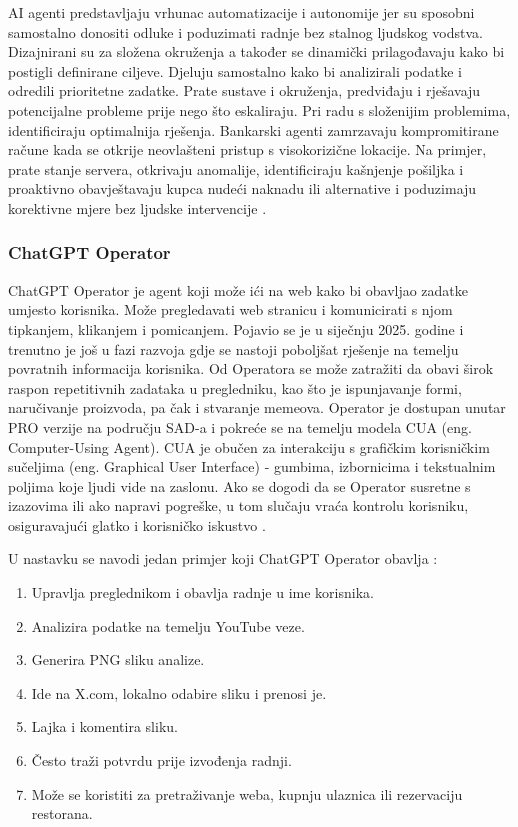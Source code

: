 \documentclass[]{foi}
\begin{document}
AI agenti predstavljaju vrhunac automatizacije i autonomije jer su sposobni samostalno donositi odluke i poduzimati radnje bez stalnog ljudskog vodstva. Dizajnirani su za složena okruženja a 
također se dinamički prilagođavaju kako bi postigli definirane ciljeve. Djeluju samostalno kako bi analizirali podatke i odredili prioritetne zadatke. Prate sustave i okruženja, predviđaju i rješavaju 
potencijalne probleme prije nego što eskaliraju. Pri radu s složenijim problemima, identificiraju optimalnija rješenja. Bankarski agenti zamrzavaju kompromitirane račune kada se otkrije neovlašteni pristup s visokorizične lokacije.
Na primjer, prate stanje servera, otkrivaju anomalije, identificiraju kašnjenje pošiljka i proaktivno obavještavaju kupca nudeći naknadu ili alternative i poduzimaju korektivne mjere bez ljudske intervencije \cite{exomindset2025difference}.

\subsubsection{ChatGPT Operator}
ChatGPT Operator je agent koji može ići na web kako bi obavljao zadatke umjesto korisnika. Može pregledavati web stranicu i komunicirati s njom tipkanjem, klikanjem i pomicanjem.
Pojavio se je u siječnju 2025. godine i trenutno je još u fazi razvoja gdje se nastoji poboljšat rješenje na temelju povratnih informacija korisnika. Od Operatora se može zatražiti da obavi
širok raspon repetitivnih zadataka u pregledniku, kao što je ispunjavanje formi, naručivanje proizvoda, pa čak i stvaranje memeova. Operator je dostupan unutar PRO verzije na području SAD-a i pokreće se
na temelju modela CUA (eng. Computer-Using Agent). CUA je obučen za interakciju s grafičkim korisničkim sučeljima (eng. Graphical User Interface) - gumbima, izbornicima i tekstualnim poljima koje ljudi vide na zaslonu.
Ako se dogodi da se Operator susretne s izazovima ili ako napravi pogreške, u tom slučaju vraća kontrolu korisniku, osiguravajući glatko i korisničko iskustvo \cite{openai2024operator}. 

U nastavku se navodi jedan primjer koji ChatGPT Operator obavlja \cite{rileybrown2025tiktok}:
\begin{enumerate}
    \item Upravlja preglednikom i obavlja radnje u ime korisnika.
    \item Analizira podatke na temelju YouTube veze.
    \item Generira PNG sliku analize.
    \item Ide na X.com, lokalno odabire sliku i prenosi je.
    \item Lajka i komentira sliku.
    \item Često traži potvrdu prije izvođenja radnji.
    \item Može se koristiti za pretraživanje weba, kupnju ulaznica ili rezervaciju restorana.
\end{enumerate}
\newpage
\end{document}
